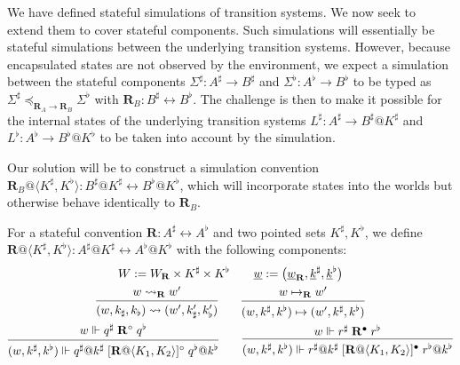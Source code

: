 \documentclass[acmsmall,screen,review,anonymous]{acmart}
\newcommand{\que}{\circ}
\newcommand{\ans}{\bullet}
\renewcommand{\preceq}{\preccurlyeq}
\newcommand{\intl}[1]{\underline{#1}}
\begin{document}
We have defined stateful simulations of transition systems.
We now seek to extend them to cover stateful components.
Such simulations will essentially be
stateful simulations between the underlying transition systems.
However,
because encapsulated states are not observed by the environment,
we expect a simulation between the stateful components
$\Sigma^\sharp : A^\sharp \rightarrow B^\sharp$ and
$\Sigma^\flat : A^\flat \rightarrow B^\flat$
to be typed as
$
  \Sigma^\sharp \preceq_{\mathbf{R}_A \rightarrow \mathbf{R}_B}
  \Sigma^\flat
$
with $\mathbf{R}_B : B^\sharp \leftrightarrow B^\flat$.
The challenge is then to make it possible for
the internal states of the underlying transition systems
$L^\sharp : A^\sharp \rightarrow B^\sharp@K^\sharp$
and
$L^\flat : A^\flat \rightarrow B^\flat@K^\flat$
to be taken into account by the simulation.

Our solution will be to construct a simulation convention
$\mathbf{R}_B@\langle K^\sharp, K^\flat \rangle :
 B^\sharp@K^\sharp \leftrightarrow B^\flat@K^\flat$,
which will incorporate states into the worlds
but otherwise behave identically to $\mathbf{R}_B$.

\begin{definition} \label{def:liftsconv} %
For a stateful convention
$\mathbf{R} : A^\sharp \leftrightarrow A^\flat$
and two pointed sets $K^\sharp, K^\flat$, 
we define %
$\mathbf{R}@\langle K^\sharp,K^\flat \rangle :
   A^\sharp@K^\sharp \leftrightarrow A^\flat@K^\flat$
with the following components:
\begin{gather*}
  W := W_\mathbf{R} \times K^\sharp \times K^\flat
  \qquad
  \intl{w} := \big( \intl{w}_\mathbf{R}, \intl{k}^\sharp, \intl{k}^\flat \big)
  \\
 {\begin{prooftree}
    \hypo{w \leadsto_\mathbf{R} w'}
    \infer1{(w, k_\sharp, k_\flat) \leadsto (w', k_\sharp', k_\flat')}
  \end{prooftree}}
  \qquad
 {\begin{prooftree}
    \hypo{w \mapsto_\mathbf{R} w'}
    \infer1{(w, k^\sharp, k^\flat) \mapsto (w', k^\sharp, k^\flat)}
  \end{prooftree}}
  \\
 {\begin{prooftree}
    \hypo{w \Vdash q^\sharp \mathrel{\mathbf{R}^\que}
                   q^\flat}
    \infer1{
      (w, k^\sharp, k^\flat) \Vdash
      q^\sharp@k^\sharp
      \mathrel{[\mathbf{R}@\langle K_1, K_2 \rangle]^\que}
      q^\flat@k^\flat}
  \end{prooftree}}
  \qquad
 {\begin{prooftree}
    \hypo{w \Vdash r^\sharp \mathrel{\mathbf{R}^\ans}
                   r^\flat}
    \infer1{
      (w, k^\sharp, k^\flat) \Vdash
      r^\sharp@k^\sharp
      \mathrel{[\mathbf{R}@\langle K_1, K_2 \rangle]^\ans}
      r^\flat@k^\flat}
  \end{prooftree}}
\end{gather*}
\end{definition}
\end{document}
